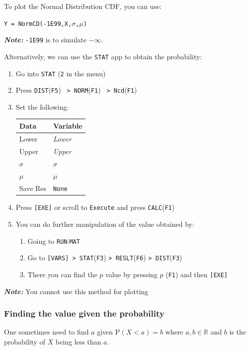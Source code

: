 \documentclass[a5paper,draft]{memoir}
\def\code#1{\texttt{#1}}
\def\note#1{\textbf{\textit{Note:}} #1}
\def\runmat{\code{RUN$\cdot$MAT} }
\def\Fone{(\code{F1}) }
\def\Fthree{(\code{F3}) }
\def\Ffive{(\code{F5}) }
\def\Fsix{(\code{F6}) }
\begin{document}
To plot the Normal Distribution CDF, you can use:
\begin{center}
	\code{Y = NormCD(-1E99,X,$\sigma$,$\mu$)}
\end{center}

\note{\code{-1E99} is to simulate $-\infty$.}

Alternatively, we can use the \code{STAT} app to obtain the probability:
\begin{enumerate}
	\item Go into \code{STAT} (\code{2} in the menu)
	\item Press \code{DIST}\Ffive\code{ > NORM}\Fone\code{ > Ncd}\Fone
	\item Set the following:
	\begin{center}
		\setlength{\tabcolsep}{10pt}
		\renewcommand{\arraystretch}{1.2}
		\begin{tabular}{|l|l|}
			\hline
			Data		& Variable \\
			\hline
			Lower		& \textit{Lower} \\
			\hline
			Upper		& \textit{Upper} \\
			\hline
			$\sigma$	& $\sigma$ \\
			\hline
			$\mu$		& $\mu$ \\
			\hline
			Save Res	& \code{None} \\
			\hline
		\end{tabular}
	\end{center}
	\item Press \code{[EXE]} or scroll to \code{Execute} and press \code{CALC}\Fone
	\item You can do further manipulation of the value obtained by:
	\begin{enumerate}
		\item Going to \runmat
		\item Go to \code{[VARS] > STAT}\Fthree \code{> RESLT}\Fsix\code{> DIST}\Fthree
		\item There you can find the $p$ value by pressing $p$ \Fone and then \code{[EXE]}
	\end{enumerate} 
\end{enumerate}
\note{You cannot use this method for plotting}

\subsubsection{Finding the value given the probability}
One sometimes need to find $a$ given $\textrm{P}(X < a) = b$ where $a,b \in \mathbb{R}$ and $b$ is the probability of $X$ being less than $a$. 
\end{document}
